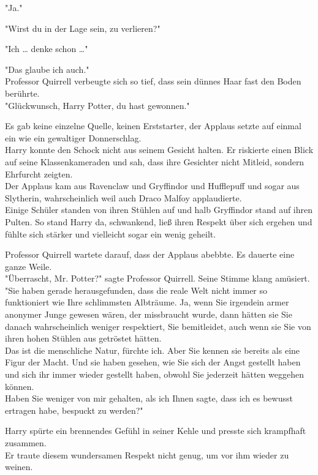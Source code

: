 {"Ja."

"Wirst du in der Lage sein, zu verlieren?"

"Ich … denke schon …"

"Das glaube ich auch."\\ Professor Quirrell verbeugte sich so tief, dass sein dünnes Haar fast den Boden berührte.\\ "Glückwunsch, Harry Potter, du hast gewonnen."

Es gab keine einzelne Quelle, keinen Erststarter, der Applaus setzte auf einmal ein wie ein gewaltiger Donnerschlag.\\ Harry konnte den Schock nicht aus seinem Gesicht halten. Er riskierte einen Blick auf seine Klassenkameraden und sah, dass ihre Gesichter nicht Mitleid, sondern Ehrfurcht zeigten.\\ Der Applaus kam aus Ravenclaw und Gryffindor und Hufflepuff und sogar aus Slytherin, wahrscheinlich weil auch Draco Malfoy applaudierte.\\ Einige Schüler standen von ihren Stühlen auf und halb Gryffindor stand auf ihren Pulten. So stand Harry da, schwankend, ließ ihren Respekt über sich ergehen und fühlte sich stärker und vielleicht sogar ein wenig geheilt.

Professor Quirrell wartete darauf, dass der Applaus abebbte. Es dauerte eine ganze Weile.\\ "Überrascht, Mr. Potter?" sagte Professor Quirrell. Seine Stimme klang amüsiert.\\ "Sie haben gerade herausgefunden, dass die reale Welt nicht immer so funktioniert wie Ihre schlimmsten Albträume. Ja, wenn Sie irgendein armer anonymer Junge gewesen wären, der missbraucht wurde, dann hätten sie Sie danach wahrscheinlich weniger respektiert, Sie bemitleidet, auch wenn sie Sie von ihren hohen Stühlen aus getröstet hätten.\\ Das ist die menschliche Natur, fürchte ich. Aber Sie kennen sie bereits als eine Figur der Macht. Und sie haben gesehen, wie Sie sich der Angst gestellt haben und sich ihr immer wieder gestellt haben, obwohl Sie jederzeit hätten weggehen können.\\ Haben Sie weniger von mir gehalten, als ich Ihnen sagte, dass ich es bewusst ertragen habe, bespuckt zu werden?"

Harry spürte ein brennendes Gefühl in seiner Kehle und presste sich krampfhaft zusammen.\\ Er traute diesem wundersamen Respekt nicht genug, um vor ihm wieder zu weinen.

}
